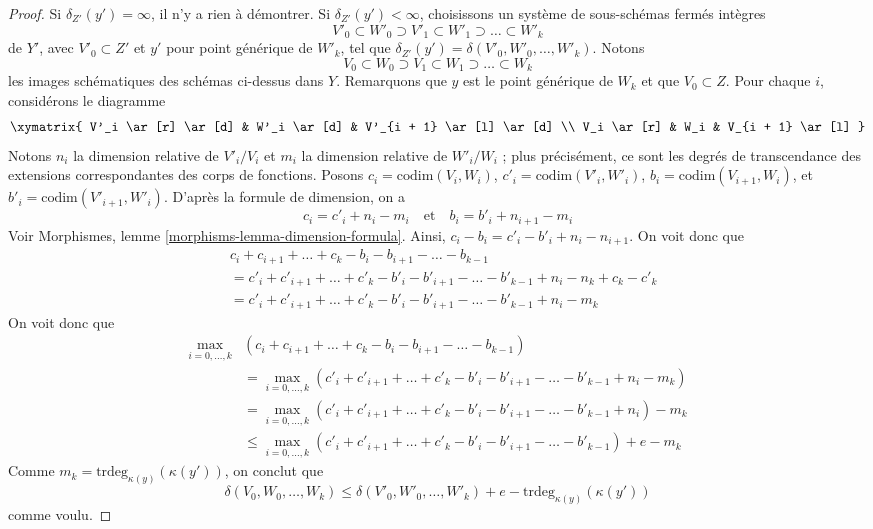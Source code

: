\begin{proof}
Si $\delta_{Z'}(y') = \infty$, il n'y a rien à démontrer.
Si $\delta_{Z'}(y') < \infty$, choisissons un système
de sous-schémas fermés intègres
$$
V'_0 \subset W'_0 \supset V'_1 \subset W'_1 \supset \ldots \subset W'_k
$$
de $Y'$, avec $V'_0 \subset Z'$ et $y'$ pour point générique de $W'_k$,
tel que $\delta_{Z'}(y') = \delta(V'_0, W'_0, \ldots, W'_k)$.
Notons
$$
V_0 \subset W_0 \supset V_1 \subset W_1 \supset \ldots \subset W_k
$$
les images schématiques des schémas ci-dessus dans $Y$. Remarquons
que $y$ est le point générique de $W_k$ et que $V_0 \subset Z$.
Pour chaque $i$, considérons le diagramme
$$
\xymatrix{
V'_i \ar[r] \ar[d] & W'_i \ar[d] & V'_{i + 1} \ar[l] \ar[d] \\
V_i \ar[r] & W_i & V_{i + 1} \ar[l]
}
$$
Notons $n_i$ la dimension relative de $V'_i/V_i$ et
$m_i$ la dimension relative de $W'_i/W_i$ ; plus précisément,
ce sont les degrés de transcendance des extensions correspondantes
des corps de fonctions. Posons
$c_i = \text{codim}(V_i, W_i)$,
$c'_i = \text{codim}(V'_i, W'_i)$,
$b_i = \text{codim}(V_{i + 1}, W_i)$, et
$b'_i = \text{codim}(V'_{i + 1}, W'_i)$.
D'après la formule de dimension, on a
$$
c_i = c'_i + n_i - m_i
\quad\text{et}\quad
b_i = b'_i + n_{i + 1} - m_i
$$
Voir Morphismes, lemme \ref{morphisms-lemma-dimension-formula}.
Ainsi, $c_i - b_i = c'_i - b'_i + n_i - n_{i + 1}$. On voit donc que
\begin{align*}
& c_i + c_{i + 1} + \ldots + c_k - b_i - b_{i + 1} - \ldots - b_{k - 1} \\
& =
c'_i + c'_{i + 1} + \ldots + c'_k - b'_i - b'_{i + 1} - \ldots - b'_{k - 1}
+ n_i - n_k + c_k - c'_k \\
& =
c'_i + c'_{i + 1} + \ldots + c'_k - b'_i - b'_{i + 1} - \ldots - b'_{k - 1}
+ n_i - m_k
\end{align*}
On voit donc que
\begin{align*}
\max_{i = 0, \ldots, k}
& (c_i + c_{i + 1} + \ldots + c_k - b_i - b_{i + 1} - \ldots - b_{k - 1}) \\
& =
\max_{i = 0, \ldots, k}
(c'_i + c'_{i + 1} + \ldots + c'_k - b'_i - b'_{i + 1} - \ldots - b'_{k - 1}
+ n_i - m_k) \\
& =
\max_{i = 0, \ldots, k}
(c'_i + c'_{i + 1} + \ldots + c'_k - b'_i - b'_{i + 1} - \ldots - b'_{k - 1}
+ n_i) - m_k \\
& \leq
\max_{i = 0, \ldots, k}
(c'_i + c'_{i + 1} + \ldots + c'_k - b'_i - b'_{i + 1} - \ldots - b'_{k - 1})
+ e - m_k
\end{align*}
Comme $m_k = \text{trdeg}_{\kappa(y)}(\kappa(y'))$, on conclut que
$$
\delta(V_0, W_0, \ldots, W_k) \leq
\delta(V'_0, W'_0, \ldots, W'_k) + e - \text{trdeg}_{\kappa(y)}(\kappa(y'))
$$
comme voulu.
\end{proof}


